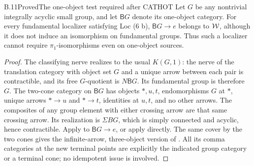 \begin{claim}{B.11}{Proved}{The one-object test required after CATHOT}
Let $G$ be any nontrivial integrally acyclic small group, and let $\mathsf BG$ denote its one-object category. For every fundamental localizer satisfying Loc (6 b), $\mathsf BG\to e$ belongs to $\mathcal{W}$, although it does not induce an isomorphism on fundamental groups. Thus such a localizer cannot require $\pi_1$-isomorphisms even on one-object sources.
\end{claim}
\begin{proof}
The classifying nerve realizes to the usual $K(G,1)$: the nerve of the translation category with object set $G$ and a unique arrow between each pair is contractible, and its free $G$-quotient is $N\mathsf BG$. Its fundamental group is therefore $G$. The two-cone category on $\mathsf BG$ has objects $*,u,t$, endomorphisms $G$ at $*$, unique arrows $*\to u$ and $*\to t$, identities at $u,t$, and no other arrows. The composites of any group element with either crossing arrow are that same crossing arrow. Its realization is $\Sigma BG$, which is simply connected and acyclic, hence contractible. Apply  to $\mathsf BG\to e$, or apply  directly. The same cover by the two cones gives the infinite-arrow, three-object version of . All its comma categories at the new terminal points are explicitly the indicated group category or a terminal cone; no idempotent issue is involved.
\end{proof}

